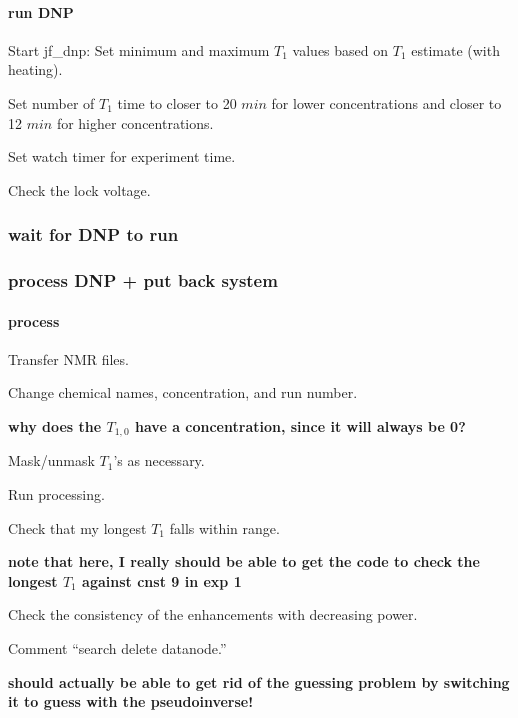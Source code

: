\paragraph{run DNP}
Start jf\_dnp: Set minimum and maximum $T_1$ values based on $T_1$ estimate (with heating).

Set number of $T_1$ time to closer to 20 $min$ for lower concentrations and closer to 12 $min$ for higher concentrations.

Set watch timer for experiment time.

Check the lock voltage.

\subsubsection{wait for DNP to run}

\subsubsection{process DNP + put back system}\label{sec:concissues_dopclowconc_process}
\paragraph{process}
Transfer NMR files.

Change chemical names, concentration, and run number.


{\bf why does the $T_{1,0}$ have a concentration, since it will always be 0?}

Mask/unmask $T_1$'s as necessary.

Run processing.

Check that my longest $T_1$ falls within range.

{\bf note that here, I really should be able to get the code to check the longest $T_1$ against cnst 9 in exp 1}


Check the consistency of the enhancements with decreasing power.

Comment ``search delete datanode.''

{\bf should actually be able to get rid of the guessing problem by switching it to guess with the pseudoinverse!}

